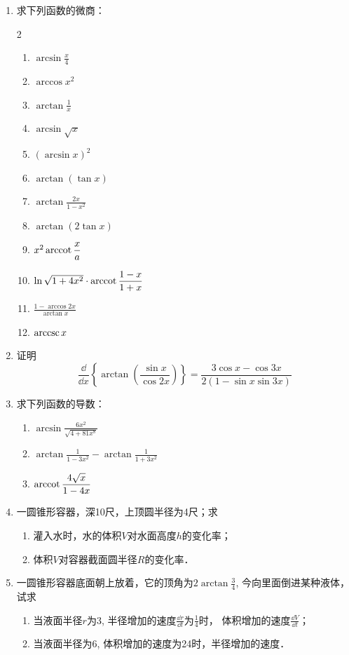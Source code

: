 \begin{ex}
\begin{enumerate}
    \item 求下列函数的微商：
\begin{multicols}{2}
\begin{enumerate}
  \item $\arcsin \frac{x}{4}$
\item  $\arccos x^{2}$
\item  $\arctan \frac{1}{x}$
\item  $\arcsin \sqrt{x}$
\item  $(\arcsin x)^{2}$
\item  $\arctan (\tan  x)$
\item $\arctan \frac{2 x}{1-x^{2}}$
\item  $\arctan (2 \tan  x)$
\item $x^{2} \operatorname{arccot} \dfrac{x}{a}$
\item $\ln \sqrt{1+4 x^{2}} \cdot \operatorname{arccot} \dfrac{1-x}{1+x}$
\item  $\frac{1-\arccos 2 x}{\arctan x}$
\item  ${\rm arccsc}\, x$
\end{enumerate}
\end{multicols}

\item 证明
   \[
    \frac{\dd}{\dd x}\left\{\arctan \left(\frac{\sin x}{\cos 2 x}\right)\right\}=\frac{3 \cos x-\cos 3 x}{2(1-\sin x \sin 3 x)}
   \]
    \item 求下列函数的导数：
\begin{enumerate}
\item $\arcsin \frac{6 x^{2}}{\sqrt{4+81 x^{8}}}$
\item $\arctan \frac{1}{1-3 x^{2}}-\arctan \frac{1}{1+3 x^{2}}$
\item $\operatorname{arccot} \dfrac{4 \sqrt{x}}{1-4 x}$
\end{enumerate}

\item 一圆锥形容器，深10尺，上顶圆半径为4尺；求
\begin{enumerate}
    \item 灌入水时，水的体积$V$对水面高度$h$的变化率；
    \item 体积$V$对容器截面圆半径$R$的变化率．
\end{enumerate}

\item 一圆锥形容器底面朝上放着，它的顶角为$2\arctan\frac{3}{4}$, 
今向里面倒进某种液体，试求
\begin{enumerate}
\item 当液面半径$r$为3, 半径增加的速度$\frac{\dd r}{\dd t}$为$\frac{1}{4}$时，
体积增加的速度$\frac{\dd V}{\dd t}$；
\item 当液面半径为6, 体积增加的速度为24时，半径增加的速度．
\end{enumerate}


\end{enumerate}
\end{ex}
